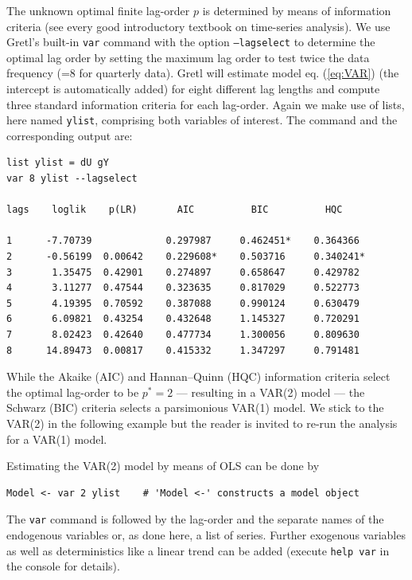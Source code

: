 \documentclass[11pt]{article}
\begin{document}
The unknown optimal finite lag-order $ p $ is determined by means of information criteria (see every good introductory textbook on time-series analysis). We use Gretl's built-in \texttt{var} command with the option \texttt{---lagselect} to determine the optimal lag order by setting the maximum lag order to test twice the data frequency (=8 for quarterly data). Gretl will estimate model eq. (\ref{eq:VAR}) (the intercept is automatically added) for eight different lag lengths and compute three standard information criteria for each lag-order. Again we make use of lists, here named \texttt{ylist}, comprising both variables of interest. The command and the corresponding output are:
\begin{Verbatim}[baselinestretch=0.75, fontsize=\small]
list ylist = dU gY
var 8 ylist --lagselect

lags    loglik    p(LR)       AIC          BIC          HQC

1      -7.70739             0.297987     0.462451*    0.364366 
2      -0.56199  0.00642    0.229608*    0.503716     0.340241*
3       1.35475  0.42901    0.274897     0.658647     0.429782 
4       3.11277  0.47544    0.323635     0.817029     0.522773 
5       4.19395  0.70592    0.387088     0.990124     0.630479 
6       6.09821  0.43254    0.432648     1.145327     0.720291 
7       8.02423  0.42640    0.477734     1.300056     0.809630 
8      14.89473  0.00817    0.415332     1.347297     0.791481 
\end{Verbatim}
While the Akaike (AIC) and Hannan–Quinn (HQC) information criteria select the optimal lag-order to be $ p^\ast = 2 $ --- resulting in a VAR(2) model --- the Schwarz (BIC) criteria selects a parsimonious VAR(1) model. We stick to the VAR(2) in the following example but the reader is invited to re-run the analysis for a VAR(1) model.

Estimating the VAR(2) model by means of OLS can be done by
\begin{Verbatim}[baselinestretch=0.75, fontsize=\small]
Model <- var 2 ylist	# 'Model <-' constructs a model object
\end{Verbatim}
The \texttt{var} command is followed by the lag-order and the separate names of the endogenous variables or, as done here, a list of series. Further exogenous variables as well as deterministics like a linear trend can be added (execute \texttt{help var} in the console for details).
\end{document}
